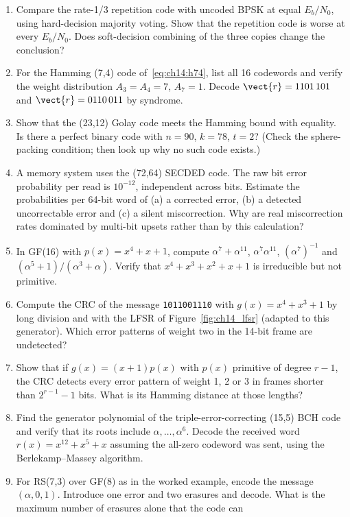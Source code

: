 \problems
\begin{enumerate}[label=\thechapter.\arabic*]
\item Compare the rate-1/3 repetition code with uncoded BPSK at equal $E_b/N_0$, using hard-decision
majority voting. Show that the repetition code is worse at every $E_b/N_0$. Does soft-decision combining
of the three copies change the conclusion?
\item For the Hamming (7,4) code of~\eqref{eq:ch14:h74}, list all 16 codewords and verify the weight
distribution $A_3=A_4=7$, $A_7=1$. Decode $\vect{r}=1101\,101$ and $\vect{r}=0110\,011$ by syndrome.
\item Show that the (23,12) Golay code meets the Hamming bound with equality. Is there a perfect binary
code with $n=90$, $k=78$, $t=2$? (Check the sphere-packing condition; then look up why no such code exists.)
\item A memory system uses the (72,64) SECDED code. The raw bit error probability per read is
$10^{-12}$, independent across bits. Estimate the probabilities per 64-bit word of (a) a corrected error,
(b) a detected uncorrectable error and (c) a silent miscorrection. Why are real miscorrection rates dominated
by multi-bit upsets rather than by this calculation?
\item In GF(16) with $p(x)=x^4+x+1$, compute $\alpha^7+\alpha^{11}$, $\alpha^7\alpha^{11}$,
$(\alpha^{7})^{-1}$ and $(\alpha^5+1)/(\alpha^3+\alpha)$. Verify that $x^4+x^3+x^2+x+1$ is irreducible but
not primitive.
\item Compute the CRC of the message \texttt{1011001110} with $g(x)=x^4+x^3+1$ by long division and with
the LFSR of Figure~\ref{fig:ch14_lfsr} (adapted to this generator). Which error patterns of weight two in
the 14-bit frame are undetected?
\item Show that if $g(x)=(x+1)p(x)$ with $p(x)$ primitive of degree $r-1$, the CRC detects every error
pattern of weight 1, 2 or 3 in frames shorter than $2^{r-1}-1$ bits. What is its Hamming distance at those
lengths?
\item Find the generator polynomial of the triple-error-correcting (15,5) BCH code and verify that its
roots include $\alpha,\dots,\alpha^6$. Decode the received word $r(x)=x^{12}+x^5+x$ assuming the
all-zero codeword was sent, using the Berlekamp--Massey algorithm.
\item For RS(7,3) over GF(8) as in the worked example, encode the message $(\alpha,0,1)$. Introduce one
error and two erasures and decode. What is the maximum number of erasures alone that the code can

\end{enumerate}
